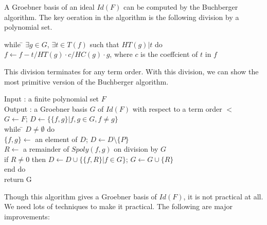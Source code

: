 \documentclass[runningheads]{cl2emult}
\begin{document}
A Groebner basis of an ideal $Id(F)$ can be computed by the Buchberger
algorithm. The key oeration in the algorithm is the following 
division by a polynomial set.
\begin{tabbing}
while \= $\exists g \in G$, $\exists t \in T(f)$ such that $HT(g)|t$ do\\
      \> $f \leftarrow f - t/HT(g) \cdot c/HC(g) \cdot g$, \quad
      where $c$ is the coeffcient of $t$ in $f$
\end{tabbing}
This division terminates for any term order.
With this division, we can show the most primitive version of the
Buchberger algorithm.
\begin{tabbing}
Input : a finite polynomial set $F$\\
Output : a Groebner basis $G$ of $Id(F)$ with respect to a term order $<$\\
$G \leftarrow F$; \quad $D \leftarrow \{\{f,g\}| f, g \in G, f \neq g \}$\\
while \= $D \neq \emptyset$ do \\
      \> $\{f,g\} \leftarrow$ an element of $D$; \quad
          $D \leftarrow D \setminus \{P\}$\\
      \> $R \leftarrow$ a remainder of $Spoly(f,g)$ on division by $G$\\
      \> if $R \neq 0$ then $D \leftarrow D \cup \{\{f,R\}| f \in G\}$; \quad
         $G \leftarrow G \cup \{R\}$\\
end do\\
return G
\end{tabbing}
Though this algorithm gives a Groebner basis of $Id(F)$, 
it is not practical at all. We need lots of techniques to make
it practical. The following are major improvements:
\end{document}

